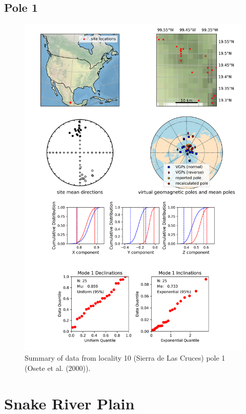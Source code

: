 \documentclass{article}
\begin{document}
\subsection{Pole 1}


\begin{figure}[H]
\centering
\includegraphics[width=5 in]{./10/1/pole_summary.png}
\caption{Summary of data from locality 10 (Sierra de Las Cruces) pole 1 (Osete et al. (2000)).}
\end{figure}

\section{Snake River Plain}
\end{document}
